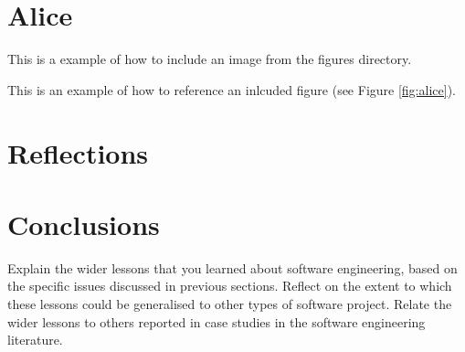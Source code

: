 \documentclass{l3proj}
\begin{document}
\newpage

\section{Alice}
\label{sec:alice}

This is a example of how to include an image from the figures directory.



This is an example of how to reference an inlcuded figure (see Figure \ref{fig:alice}).

\section{Reflections}
\label{sec:reflections}


\section{Conclusions}
\label{sec:conclusions}

Explain the wider lessons that you learned about software engineering,
based on the specific issues discussed in previous sections.  Reflect
on the extent to which these lessons could be generalised to other
types of software project.  Relate the wider lessons to others
reported in case studies in the software engineering literature.



\end{document}

